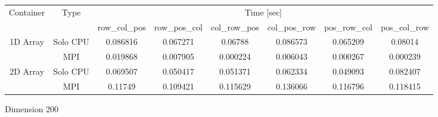 \begin{tabular}{ |c|c|c|c|c|c|c|c|  }
\hline 
\multirow{2}{*}{Container}  & \multirow{2}{*}{Type} & \multicolumn{6}{c|}{ Time [sec] } \\  \cline{3-8}

                          & & row\_col\_pos & row\_pos\_col & col\_row\_pos & col\_pos\_row  & pos\_row\_col & pos\_col\_row \\
\multirow{2}{*}{1D Array}   & Solo CPU      & 0.086816 &0.067271 &0.06788 &0.086573 &0.065209 &0.08014 \\
                            & MPI           & 0.019868 & 0.007905 & 0.000224 & 0.006043 & 0.000267 & 0.000239 \\
\hline 
 

\hline 
\multirow{2}{*}{2D Array}   & Solo CPU      & 0.069507 &0.050417 &0.051371 &0.062334 &0.049093 &0.082407 \\
                            & MPI           & 0.11749 & 0.109421 & 0.115629 & 0.136066 & 0.116796 & 0.118415 \\

\hline
\end{tabular}
\caption{ Dimension 200 }
\label{table1ntb}
